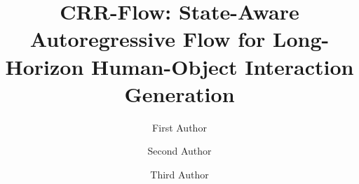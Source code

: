 \documentclass[sigconf, screen, review, anonymous]{acmart}
\begin{document}
\title{CRR-Flow: State-Aware Autoregressive Flow for Long-Horizon Human-Object Interaction Generation}

\author{First Author}

\author{Second Author}

\author{Third Author}

\renewcommand{\shortauthors}{First Author et al.}


\begin{abstract}




\end{abstract}
\end{document}
